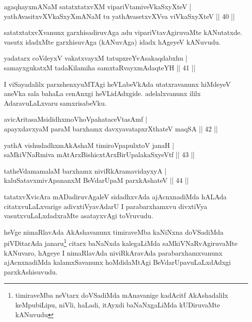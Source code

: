 \begin{shl}
agaqhayxmANaM satatxtatxvXM vipariVtamiveVkaSxyXteV  |\\
yathAvasitxvXVkaSxyXmANaM tu yathAvasetxvXVva viVkaSxyXteV \hfill || 40 ||
\end{shl}

\begin{artha}
satatxtatxvXvanunx garxhisadiruvAga adu vipariVtavAgiruvaMte kANutatxde.  vasutx idadxMte garxhisuvAga (kANuvAga) idadx hAgeyeV kANuvudu.
\end{artha}

\begin{shl}
yadatarx coVdeyxV vakatxvayxM tatupxreYvAsakaqdabxhu |\\
samayxgukatxM tadaKilamiha samxtaRvayxmAdaqteYH \hfill || 41 ||
\end{shl}

\begin{artha}
I viSayadalilx parxshenxyuMTAgi heVLabeVkAda utatxravanunx hiMdeyeV aneVka sala bahaLa cenAnxgi heVLidAdxgide. adelalxvanunx ililx AdaravuLaLxvaru samxrisabeVku.
\end{artha}


\begin{shl}
avicAritasaMsididhxmoVhoVpahataceVtasAmf |\\
apayxdavxyaM paraM barxhamx davxyavatapxrXthateV maqSA \hfill || 42 ||
\end{shl}

\begin{shl}
yathA vishudadhxmAkAshaM timiroVpapulxtoV janaH |\\
saMkiVNaRmiva mAtArxBishicxtArxBirUpalakaSxyeVtf \hfill || 43 ||
\end{shl}

\begin{shl}
tatheVdamamalaM barxhamx niviRkAramavidayxyA |\\
kaluSatavxmivA\s \s pananxM BeVdarUpaM parxkAshateV \hfill || 44 ||
\end{shl}

\begin{artha}%
tatatxvXvicAra mADadiruvAgaleV sidadhxvAda ajAcnxnadiMda hALAda citatxvuLaLxvarige adivxtiVyavAdarU I parabarxhamxvu divxtiVya vasutxvuLaLxdadxraMte asatayxvAgi toVruvudu.

heVge nimaRlavAda AkAshavanunx timiraveMba kaNiNxna doVSadiMda piVDitarAda janaru\footnote{timiraveMba neVtarx doVSadiMda mAnavanige kadAcitf AkAshadalilx keMpubiLipu, niVli, haLadi, itAyxdi baNaNxgaLiMda kUDiruvaMte kANuvudu} citarx baNaNxda kalegaLiMda saMkiVNaRvAgiruvaMte kANuvaro, hAgeye I nimaRlavAda niviRkAravAda parabarxhamxvanunx ajAcnxnadiMda kalamxSavanunx hoMdidaMtAgi BeVdarUpavuLaLxdAdxgi parxkAshisuvudu.
\end{artha}


